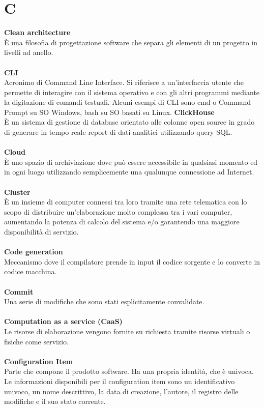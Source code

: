 \section{C}
\textbf{Clean architecture}\\
È una filosofia di progettazione software che separa gli elementi di un progetto in livelli ad anello. \\ \\
\textbf{CLI}\\
Acronimo di Command Line Interface. Si riferisce a un'interfaccia utente che permette di interagire con il sistema operativo e con gli altri programmi mediante la digitazione di comandi testuali. Alcuni esempi di CLI sono cmd o Command Prompt su SO Windows, bash su SO basati su Linux.
\textbf{ClickHouse}\\
È un sistema di gestione di database orientato alle colonne open source in grado di generare in tempo reale report di dati analitici utilizzando query SQL. \\ \\
\textbf{Cloud}\\
È uno spazio di archiviazione dove può essere accessibile in qualsiasi momento ed in ogni luogo utilizzando semplicemente una qualunque connessione ad Internet. \\ \\
\textbf{Cluster}\\
È un insieme di computer connessi tra loro tramite una rete telematica con lo scopo di distribuire un'elaborazione molto complessa tra i vari computer, aumentando la potenza di calcolo del sistema e/o garantendo una maggiore disponibilità di servizio. \\ \\
\textbf{Code generation}\\
Meccanismo dove il compilatore prende in input il codice sorgente e lo converte in codice macchina. \\ \\
\textbf{Commit}\\
Una serie di modifiche che sono stati esplicitamente convalidate. \\ \\
\textbf{Computation as a service (CaaS)}\\
Le risorse di elaborazione vengono fornite su richiesta tramite risorse virtuali o fisiche come servizio. \\ \\
\textbf{Configuration Item}\\
Parte che compone il prodotto software. Ha una propria identità, che è univoca. Le informazioni disponibili per il configuration item sono un identificativo univoco, un nome descrittivo, la data di creazione, l'autore, il registro delle modifiche e il suo stato corrente.\\ \\
